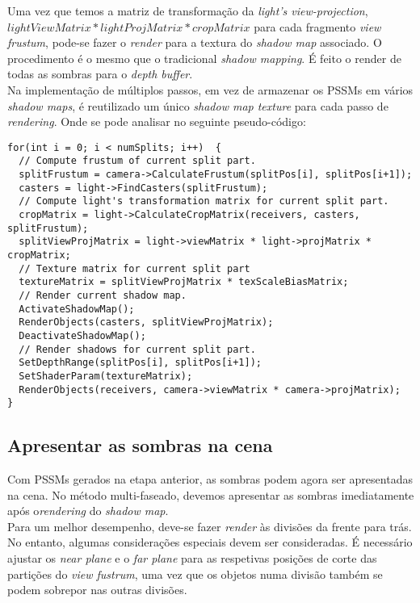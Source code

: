 \documentclass[12pt]{article}
\begin{document}
Uma vez que temos a matriz de transformação da {\it light's view-projection}, $lightViewMatrix * lightProjMatrix * cropMatrix$ para cada fragmento {\it view frustum}, pode-se fazer o {\it render} para a textura do {\it shadow map} associado. O procedimento é o mesmo que o tradicional {\it shadow mapping}. É feito o render de todas as sombras para o {\it depth buffer}.\\

Na implementação de múltiplos passos, em vez de armazenar os PSSMs em vários {\it shadow maps}, é reutilizado um único {\it shadow map texture} para cada passo de {\it rendering}. Onde se pode analisar no seguinte pseudo-código:\\
\begin{lstlisting}
for(int i = 0; i < numSplits; i++)  {  
  // Compute frustum of current split part.  
  splitFrustum = camera->CalculateFrustum(splitPos[i], splitPos[i+1]);  
  casters = light->FindCasters(splitFrustum);  
  // Compute light's transformation matrix for current split part.  
  cropMatrix = light->CalculateCropMatrix(receivers, casters,  splitFrustum);  
  splitViewProjMatrix = light->viewMatrix * light->projMatrix *  cropMatrix;  
  // Texture matrix for current split part  
  textureMatrix = splitViewProjMatrix * texScaleBiasMatrix;    
  // Render current shadow map.  
  ActivateShadowMap();  
  RenderObjects(casters, splitViewProjMatrix);  
  DeactivateShadowMap();  
  // Render shadows for current split part.  
  SetDepthRange(splitPos[i], splitPos[i+1]);  
  SetShaderParam(textureMatrix);  
  RenderObjects(receivers, camera->viewMatrix * camera->projMatrix);  
}
\end{lstlisting}
\newpage
\subsection{Apresentar as sombras na cena}
\vspace{7 mm}
\hspace{7 mm}
Com PSSMs gerados na etapa anterior, as sombras podem agora ser apresentadas na cena. No método multi-faseado, devemos apresentar as sombras imediatamente após o{\it rendering} do {\it shadow map}.\\

Para um melhor desempenho, deve-se fazer {\it render} às divisões da frente para trás. No entanto, algumas considerações especiais devem ser consideradas. É necessário ajustar os {\it near plane} e o {\it far plane} para as respetivas posições de corte das partições do {\it view fustrum}, uma vez que os objetos numa divisão também se podem sobrepor nas outras divisões. \\
\end{document}
